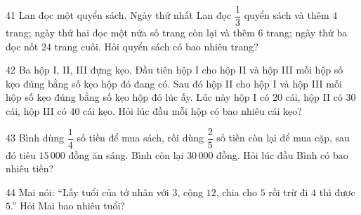 \gap
\begin{probbox}{41}{}
Lan đọc một quyển sách. Ngày thứ nhất Lan đọc $\dfrac13$ quyển sách và thêm $4$ trang; ngày thứ hai đọc một nửa số trang còn lại và thêm $6$ trang; ngày thứ ba đọc nốt $24$ trang cuối. Hỏi quyển sách có bao nhiêu trang?
\end{probbox}
\gap
\begin{probbox}{42}{}
Ba hộp I, II, III đựng kẹo. Đầu tiên hộp I cho hộp II và hộp III mỗi hộp số kẹo đúng bằng số kẹo hộp đó đang có. Sau đó hộp II cho hộp I và hộp III mỗi hộp số kẹo đúng bằng số kẹo hộp đó lúc ấy. Lúc này hộp I có $20$ cái, hộp II có $30$ cái, hộp III có $40$ cái kẹo. Hỏi lúc đầu mỗi hộp có bao nhiêu cái kẹo?
\end{probbox}
\gap
\begin{probbox}{43}{}
Bình dùng $\dfrac14$ số tiền để mua sách, rồi dùng $\dfrac25$ số tiền còn lại để mua cặp, sau đó tiêu $15\,000$ đồng ăn sáng. Bình còn lại $30\,000$ đồng. Hỏi lúc đầu Bình có bao nhiêu tiền?
\end{probbox}
\gap
\begin{probbox}{44}{}
Mai nói: ``Lấy tuổi của tớ nhân với $3$, cộng $12$, chia cho $5$ rồi trừ đi $4$ thì được $5$.'' Hỏi Mai bao nhiêu tuổi?
\end{probbox}
